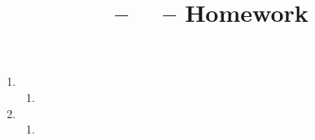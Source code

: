 \documentclass[11pt]{article}
\title{\CourseName\ -- \CourseSemester\ \CourseYear\ -- Homework \HWnum}
\author{\Name}
\begin{document}
\maketitle

\begin{enumerate}

\item
\begin{enumerate}
\item
\end{enumerate} %

\item
\begin{enumerate}
\item
\end{enumerate} %

\end{enumerate} %
\end{document}
